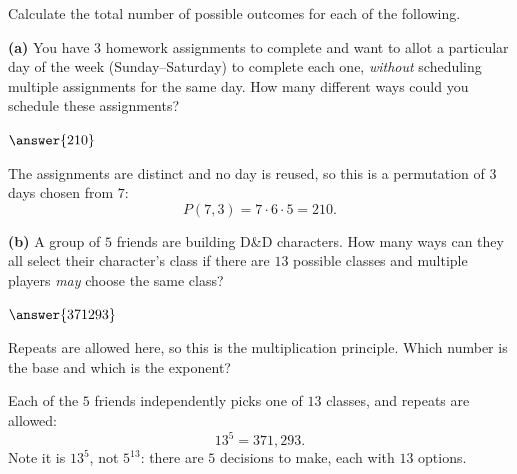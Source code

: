\documentclass[12pt]{ximera}
\begin{document}
\begin{problem}
Calculate the total number of possible outcomes for each of the following.

\begin{prompt}
\textbf{(a)} You have $3$ homework assignments to complete and want to allot a
particular day of the week (Sunday--Saturday) to complete each one, \emph{without}
scheduling multiple assignments for the same day. How many different ways could you
schedule these assignments?

$\answer{210}$

\begin{solution}
The assignments are distinct and no day is reused, so this is a permutation of $3$
days chosen from $7$:
\[ P(7,3)=7\cdot 6\cdot 5 = 210. \]
\end{solution}
\end{prompt}

\begin{prompt}
\textbf{(b)} A group of $5$ friends are building D\&D characters. How many ways can
they all select their character's class if there are $13$ possible classes and
multiple players \emph{may} choose the same class?

$\answer{371293}$

\begin{hint}
Repeats are allowed here, so this is the multiplication principle. Which number is
the base and which is the exponent?
\end{hint}

\begin{solution}
Each of the $5$ friends independently picks one of $13$ classes, and repeats are
allowed:
\[ 13^5 = 371{,}293. \]
Note it is $13^5$, not $5^{13}$: there are $5$ decisions to make, each with $13$
options.
\end{solution}
\end{prompt}
\end{problem}
\end{document}
